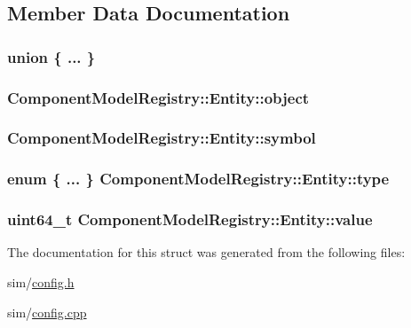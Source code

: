 \subsection{Member Data Documentation}
\hypertarget{struct_component_model_registry_1_1_entity_a95dc495858d594408ba34f7c7fea9d6b}{\subsubsection[{"@82}]{\setlength{\rightskip}{0pt plus 5cm}union \{ ... \} }}\label{struct_component_model_registry_1_1_entity_a95dc495858d594408ba34f7c7fea9d6b}
\hypertarget{struct_component_model_registry_1_1_entity_a3ec24673c1e35e8b3554c7e170861d23}{
\subsubsection[{object}]{ Component\+Model\+Registry\+::\+Entity\+::object}}\label{struct_component_model_registry_1_1_entity_a3ec24673c1e35e8b3554c7e170861d23}
\hypertarget{struct_component_model_registry_1_1_entity_afd1e3662c71124bf3fd19947fa5d1349}{
\subsubsection[{symbol}]{ Component\+Model\+Registry\+::\+Entity\+::symbol}}\label{struct_component_model_registry_1_1_entity_afd1e3662c71124bf3fd19947fa5d1349}
\hypertarget{struct_component_model_registry_1_1_entity_abc7ff8f8813d0241421ade34865d1757}{
\subsubsection[{type}]{\setlength{\rightskip}{0pt plus 5cm}enum \{ ... \}   Component\+Model\+Registry\+::\+Entity\+::type}}\label{struct_component_model_registry_1_1_entity_abc7ff8f8813d0241421ade34865d1757}
\hypertarget{struct_component_model_registry_1_1_entity_a917268223412c13b12e6fe376af90f8e}{
\subsubsection[{value}]{\setlength{\rightskip}{0pt plus 5cm}uint64\+\_\+t Component\+Model\+Registry\+::\+Entity\+::value}}\label{struct_component_model_registry_1_1_entity_a917268223412c13b12e6fe376af90f8e}


The documentation for this struct was generated from the following files\+:\begin{DoxyCompactItemize}
\item 
sim/\hyperlink{config_8h}{config.\+h}\item 
sim/\hyperlink{config_8cpp}{config.\+cpp}\end{DoxyCompactItemize}
